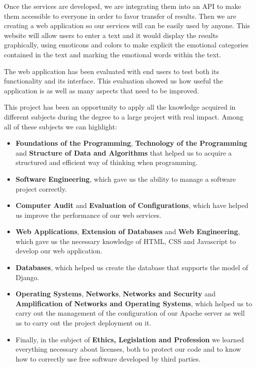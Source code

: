 Once the services are developed, we are integrating them into an API to make them accessible to everyone in order to favor transfer of results. Then we are creating a web application so our services will can be easily used by anyone. This website will allow users to enter a text and it would display the results graphically, using emoticons and colors to make explicit the emotional categories contained in the text and marking the emotional words within the text.

The web application has been evaluated with end users to test both its functionality and its interface. This evaluation showed us how useful the application is as well as many aspects that need to be improved.

This project has been an opportunity to apply all the knowledge acquired in different subjects during the degree to a large project with real impact. Among all of these subjects we can highlight:

\begin{itemize}
	\item \textbf{Foundations of the Programming}, \textbf{Technology of the Programming} and \textbf{Structure of Data and Algorithms} that helped us to acquire a structured and efficient way of thinking when programming.
	\item \textbf{Software Engineering}, which gave us the ability to manage a software project correctly.
	\item \textbf{Computer Audit} and \textbf{Evaluation of Configurations}, which have helped us improve the performance of our web services.
	\item  \textbf{Web Applications}, \textbf{Extension of Databases} and \textbf{Web Engineering}, which gave us the necessary knowledge of HTML, CSS and Javascript to develop our web application.
	\item \textbf {Databases}, which helped us create the database that supports the model of Django.
	\item \textbf{Operating Systems}, \textbf{Networks}, \textbf{Networks and Security} and \textbf{Amplification of Networks and Operating Systems}, which helped us to carry out the management of the configuration of our Apache server as well as to carry out the project deployment on it.
	\item Finally, in the subject of \textbf{Ethics, Legislation and Profession} we learned everything necessary about licenses, both to protect our code and to know how to correctly use free software developed by third parties.
\end{itemize}
      
